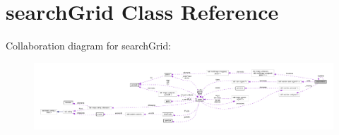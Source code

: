 \hypertarget{classsearchGrid}{}\section{search\+Grid Class Reference}
\label{classsearchGrid}


Collaboration diagram for search\+Grid\+:
\nopagebreak
\begin{figure}[H]
\begin{center}
\leavevmode
\includegraphics[width=350pt]{classsearchGrid__coll__graph}
\end{center}
\end{figure}
